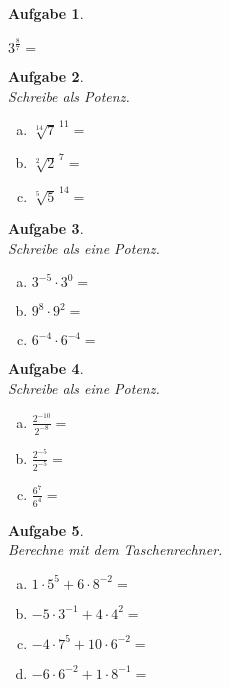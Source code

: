 \documentclass[12pt,fleqn]{article}
\theoremstyle{aufg}
\newtheorem{aufgabe}{Aufgabe}
\theoremstyle{bsp}
\begin{document}
\begin{flushleft}
\begin{aufgabe}
\begin{multicols}{3}
\begin{enumerate}[a)]
$3^{\frac{8}{7}}=$
\end{enumerate} 
\end{multicols} 
\end{aufgabe} 
\begin{aufgabe} ~ \\ 
Schreibe als Potenz. \\ 
\begin{multicols}{3} 
\begin{enumerate}[a)] 
\item 
$\sqrt[14]{7}^{\,11}=$
\item 
$\sqrt[2]{2}^{\,7}=$
\item 
$\sqrt[5]{5}^{\,14}=$
\end{enumerate} 
\end{multicols} 
\end{aufgabe} 
\begin{aufgabe} ~ \\ 
Schreibe als eine Potenz. \\ 
\begin{multicols}{3} 
\begin{enumerate}[a)] 
\item 
$3^{-5}\cdot3^{0}=$
\item 
$9^{8}\cdot9^{2}=$
\item 
$6^{-4}\cdot6^{-4}=$
\end{enumerate} 
\end{multicols} 
\end{aufgabe} 
\begin{aufgabe} ~ \\ 
Schreibe als eine Potenz. \\ 
\begin{multicols}{3} 
\begin{enumerate}[a)] 
\item 
$\frac{2^{-10}}{2^{-8}}=$
\item 
$\frac{2^{-5}}{2^{-5}}=$
\item 
$\frac{6^{7}}{6^{4}}=$
\end{enumerate} 
\end{multicols} 
\end{aufgabe} 
\begin{aufgabe} ~ \\ 
Berechne mit dem Taschenrechner. \\ 
\begin{multicols}{2} 
\begin{enumerate}[a)] 
\item 
$1\cdot5^{5}+6\cdot8^{-2}=$
\item 
$-5\cdot3^{-1}+4\cdot4^{2}=$
\item 
$-4\cdot7^{5}+10\cdot6^{-2}=$
\item 
$-6\cdot6^{-2}+1\cdot8^{-1}=$
\end{enumerate} 
\end{multicols} 
\end{aufgabe} 
\end{flushleft} 
\end{document}
